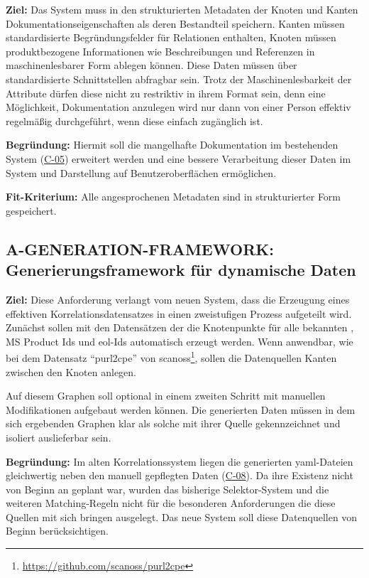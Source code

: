 \textbf{Ziel:}
Das System muss in den strukturierten Metadaten der Knoten und Kanten Dokumentationseigenschaften als deren Bestandteil speichern.
Kanten müssen standardisierte Begründungsfelder für Relationen enthalten, Knoten müssen produktbezogene Informationen wie Beschreibungen und Referenzen in maschinenlesbarer Form ablegen können.
Diese Daten müssen über standardisierte Schnittstellen abfragbar sein.
Trotz der Maschinenlesbarkeit der Attribute dürfen diese nicht zu restriktiv in ihrem Format sein, denn eine Möglichkeit, Dokumentation anzulegen wird nur dann von einer Person effektiv regelmäßig durchgeführt, wenn diese einfach zugänglich ist.

\textbf{Begründung:}
Hiermit soll die mangelhafte Dokumentation im bestehenden System (\hyperref[subsec:c-05-reason-not-good-enough]{C-05}) erweitert werden und eine bessere Verarbeitung dieser Daten im System und Darstellung auf Benutzeroberflächen ermöglichen.

\textbf{Fit-Kriterium:}
Alle angesprochenen Metadaten sind in strukturierter Form gespeichert.

\subsection{A-GENERATION-FRAMEWORK: Generierungsframework für dynamische Daten}\label{subsec:req-generated-data}

\textbf{Ziel:}
Diese Anforderung verlangt vom neuen System, dass die Erzeugung eines effektiven Korrelationsdatensatzes in einen zweistufigen Prozess aufgeteilt wird.
Zunächst sollen mit den Datensätzen der \metaeffektsp die Knotenpunkte für alle bekannten , MS Product Ids und \acrshort{eol}-Ids automatisch erzeugt werden.
Wenn anwendbar, wie bei dem Datensatz \enquote{purl2cpe} von scanoss\footnote{\url{https://github.com/scanoss/purl2cpe}}, sollen die Datenquellen Kanten zwischen den Knoten anlegen.

Auf diesem Graphen soll optional in einem zweiten Schritt mit manuellen Modifikationen aufgebaut werden können.
Die generierten Daten müssen in dem sich ergebenden Graphen klar als solche mit ihrer Quelle gekennzeichnet und isoliert auslieferbar sein.

\textbf{Begründung:}
Im alten Korrelationssystem liegen die generierten \acrshort{yaml}-Dateien gleichwertig neben den manuell gepflegten Daten (\hyperref[subsec:c-08-generated-correlation-data]{C-08}).
Da ihre Existenz nicht von Beginn an geplant war, wurden das bisherige Selektor-System und die weiteren Matching-Regeln nicht für die besonderen Anforderungen die diese Quellen mit sich bringen ausgelegt.
Das neue System soll diese Datenquellen von Beginn berücksichtigen.

